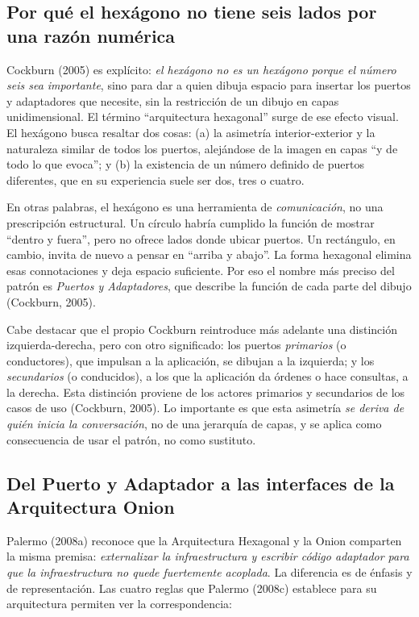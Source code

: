 \documentclass[11pt,a4paper]{article}
\begin{document}
\subsection{Por qué el hexágono no tiene seis lados por una razón numérica}

Cockburn (2005) es explícito: \emph{el hexágono no es un hexágono porque el número seis sea importante}, sino para dar a quien dibuja espacio para insertar los puertos y adaptadores que necesite, sin la restricción de un dibujo en capas unidimensional. El término ``arquitectura hexagonal'' surge de ese efecto visual. El hexágono busca resaltar dos cosas: (a) la asimetría interior-exterior y la naturaleza similar de todos los puertos, alejándose de la imagen en capas ``y de todo lo que evoca''; y (b) la existencia de un número definido de puertos diferentes, que en su experiencia suele ser dos, tres o cuatro.

En otras palabras, el hexágono es una herramienta de \emph{comunicación}, no una prescripción estructural. Un círculo habría cumplido la función de mostrar ``dentro y fuera'', pero no ofrece lados donde ubicar puertos. Un rectángulo, en cambio, invita de nuevo a pensar en ``arriba y abajo''. La forma hexagonal elimina esas connotaciones y deja espacio suficiente. Por eso el nombre más preciso del patrón es \emph{Puertos y Adaptadores}, que describe la función de cada parte del dibujo (Cockburn, 2005).

Cabe destacar que el propio Cockburn reintroduce más adelante una distinción izquierda-derecha, pero con otro significado: los puertos \emph{primarios} (o conductores), que impulsan a la aplicación, se dibujan a la izquierda; y los \emph{secundarios} (o conducidos), a los que la aplicación da órdenes o hace consultas, a la derecha. Esta distinción proviene de los actores primarios y secundarios de los casos de uso (Cockburn, 2005). Lo importante es que esta asimetría \emph{se deriva de quién inicia la conversación}, no de una jerarquía de capas, y se aplica como consecuencia de usar el patrón, no como sustituto.

\subsection{Del Puerto y Adaptador a las interfaces de la Arquitectura Onion}

Palermo (2008a) reconoce que la Arquitectura Hexagonal y la Onion comparten la misma premisa: \emph{externalizar la infraestructura y escribir código adaptador para que la infraestructura no quede fuertemente acoplada}. La diferencia es de énfasis y de representación. Las cuatro reglas que Palermo (2008c) establece para su arquitectura permiten ver la correspondencia:
\end{document}
